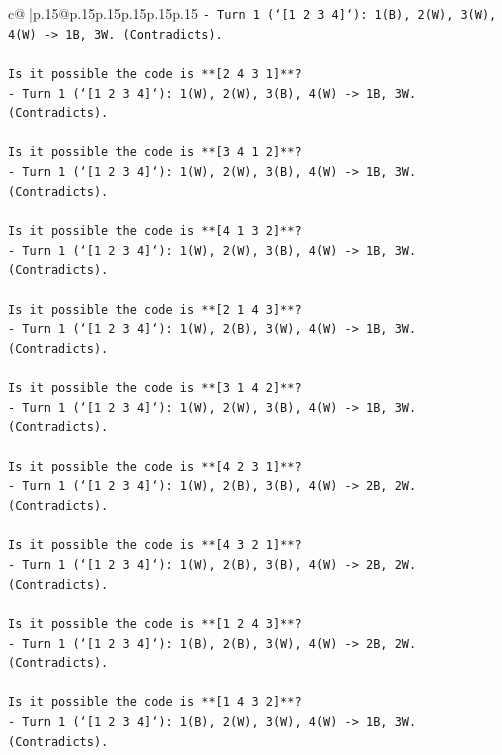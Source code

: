 \documentclass{article}
\begin{document}
{\begin{supertabular}{c@{$\;$}|p{.15\linewidth}@{}p{.15\linewidth}p{.15\linewidth}p{.15\linewidth}p{.15\linewidth}p{.15\linewidth}}
{{{\texttt{{-} Turn 1 (`{[}1 2 3 4{]}`): 1(B), 2(W), 3(W), 4(W) {-}> 1B, 3W. (Contradicts).} \\
\\ 
\texttt{Is it possible the code is **{[}2 4 3 1{]}**?} \\
\texttt{{-} Turn 1 (`{[}1 2 3 4{]}`): 1(W), 2(W), 3(B), 4(W) {-}> 1B, 3W. (Contradicts).} \\
\\ 
\texttt{Is it possible the code is **{[}3 4 1 2{]}**?} \\
\texttt{{-} Turn 1 (`{[}1 2 3 4{]}`): 1(W), 2(W), 3(B), 4(W) {-}> 1B, 3W. (Contradicts).} \\
\\ 
\texttt{Is it possible the code is **{[}4 1 3 2{]}**?} \\
\texttt{{-} Turn 1 (`{[}1 2 3 4{]}`): 1(W), 2(W), 3(B), 4(W) {-}> 1B, 3W. (Contradicts).} \\
\\ 
\texttt{Is it possible the code is **{[}2 1 4 3{]}**?} \\
\texttt{{-} Turn 1 (`{[}1 2 3 4{]}`): 1(W), 2(B), 3(W), 4(W) {-}> 1B, 3W. (Contradicts).} \\
\\ 
\texttt{Is it possible the code is **{[}3 1 4 2{]}**?} \\
\texttt{{-} Turn 1 (`{[}1 2 3 4{]}`): 1(W), 2(W), 3(B), 4(W) {-}> 1B, 3W. (Contradicts).} \\
\\ 
\texttt{Is it possible the code is **{[}4 2 3 1{]}**?} \\
\texttt{{-} Turn 1 (`{[}1 2 3 4{]}`): 1(W), 2(B), 3(B), 4(W) {-}> 2B, 2W. (Contradicts).} \\
\\ 
\texttt{Is it possible the code is **{[}4 3 2 1{]}**?} \\
\texttt{{-} Turn 1 (`{[}1 2 3 4{]}`): 1(W), 2(B), 3(B), 4(W) {-}> 2B, 2W. (Contradicts).} \\
\\ 
\texttt{Is it possible the code is **{[}1 2 4 3{]}**?} \\
\texttt{{-} Turn 1 (`{[}1 2 3 4{]}`): 1(B), 2(B), 3(W), 4(W) {-}> 2B, 2W. (Contradicts).} \\
\\ 
\texttt{Is it possible the code is **{[}1 4 3 2{]}**?} \\
\texttt{{-} Turn 1 (`{[}1 2 3 4{]}`): 1(B), 2(W), 3(W), 4(W) {-}> 1B, 3W. (Contradicts).} \\
}}}
\end{supertabular}}
\end{document}
